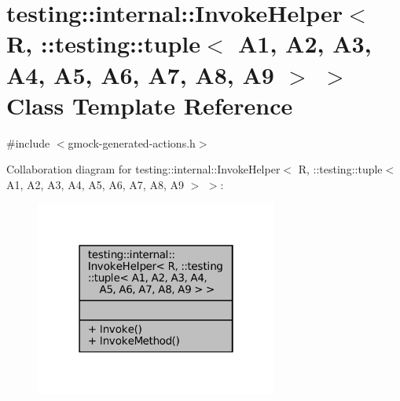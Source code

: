 \hypertarget{classtesting_1_1internal_1_1InvokeHelper_3_01R_00_01_1_1testing_1_1tuple_3_01A1_00_01A2_00_01A3_1c5f66c8b5e7674a520f1ea38507628c}{}\section{testing\+:\+:internal\+:\+:Invoke\+Helper$<$ R, \+:\+:testing\+:\+:tuple$<$ A1, A2, A3, A4, A5, A6, A7, A8, A9 $>$ $>$ Class Template Reference}
\label{classtesting_1_1internal_1_1InvokeHelper_3_01R_00_01_1_1testing_1_1tuple_3_01A1_00_01A2_00_01A3_1c5f66c8b5e7674a520f1ea38507628c}


{\ttfamily \#include $<$gmock-\/generated-\/actions.\+h$>$}



Collaboration diagram for testing\+:\+:internal\+:\+:Invoke\+Helper$<$ R, \+:\+:testing\+:\+:tuple$<$ A1, A2, A3, A4, A5, A6, A7, A8, A9 $>$ $>$\+:
\nopagebreak
\begin{figure}[H]
\begin{center}
\leavevmode
\includegraphics[width=226pt]{classtesting_1_1internal_1_1InvokeHelper_3_01R_00_01_1_1testing_1_1tuple_3_01A1_00_01A2_00_01A3_e3cfd36d4d653af68822251f5c7ced78}
\end{center}
\end{figure}
